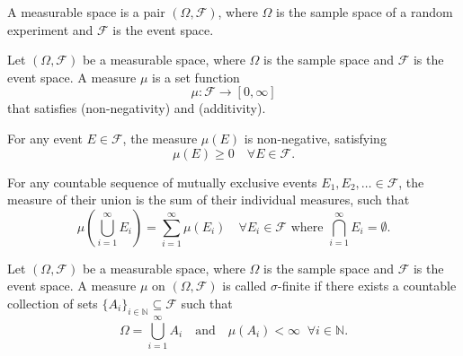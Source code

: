 \begin{definition}
	\label{def:measurable_space}
	A measurable space is a pair $(\Omega, \mathcal{F})$, where $\Omega$ is the sample space of a random experiment and $\mathcal{F}$ is the event space.
\end{definition}

\begin{definition}[Measure]
	\label{def:measure}
	Let $(\Omega, \mathcal{F})$ be a measurable space, where $\Omega$ is the sample space and $\mathcal{F}$ is the event space. A measure $\mu$ is a set function
	\begin{equation}
		\mu\colon \mathcal{F} \to [0,\infty]
	\end{equation}
	that satisfies  (non-negativity) and  (additivity).
\end{definition}

\begin{axiom}
	\label{ax:non_neg}
	For any event $E\in \mathcal{F}$, the measure $\mu(E)$ is non-negative, satisfying
	\begin{equation}
		\mu(E) \geq 0 \quad \forall E \in  \mathcal{F}.
	\end{equation}
\end{axiom}

\begin{axiom}[Additivity]
	\label{ax:add}
	For any countable sequence of mutually exclusive events $E_1, E_2, \ldots\in \mathcal{F}$, the measure of their union is the sum of their individual measures, such that
	\begin{equation}
		\mu\left(\bigcup_{i=1}^{\infty} \mathit{E}_i\right) = \sum_{i=1}^{\infty} \mu(\mathit{E}_i) \quad \forall \mathit{E}_i \in \mathcal{F} \text{ where } \bigcap_{i=1}^{\infty} \mathit{E}_i = \emptyset.
	\end{equation}
\end{axiom}

\begin{definition}
	\label{def:sigma_finite_measure}
	Let $(\Omega, \mathcal{F})$ be a measurable space, where $\Omega$ is the sample space and $\mathcal{F}$ is the event space. A measure $\mu$ on $(\Omega, \mathcal{F})$ is called $\sigma$-finite if there exists a countable collection of sets $\{A_i\}_{i\in\mathbb{N}} \subseteq \mathcal{F}$ such that 
	\begin{equation}
		\Omega = \bigcup_{i=1}^\infty A_i
		\quad\text{and}\quad 
		\mu(A_i) < \infty \;\; \forall i\in\mathbb{N}.
	\end{equation}
\end{definition}

